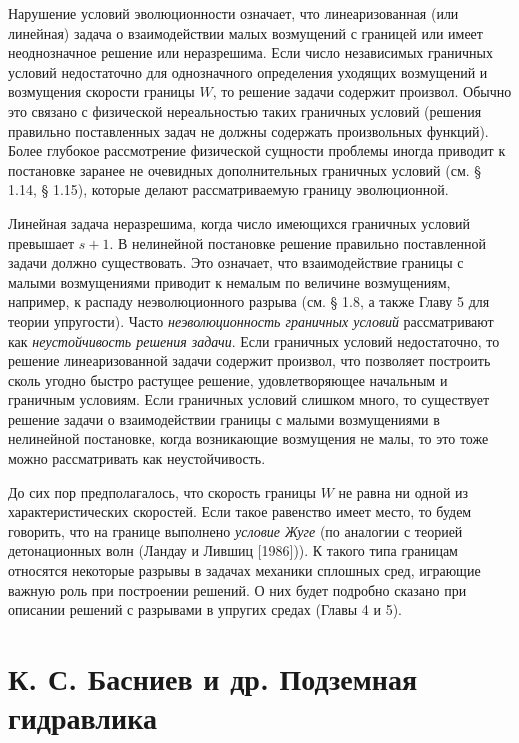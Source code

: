 Нарушение условий эволюционности означает, что линеаризованная (или линейная) задача о взаимодействии малых возмущений с границей или имеет неоднозначное решение или неразрешима. Если число независимых граничных условий недостаточно для однозначного определения уходящих возмущений и возмущения скорости границы $W$, то решение задачи содержит произвол. Обычно это связано с физической нереальностью таких граничных условий (решения правильно поставленных задач не должны содержать произвольных функций). Более глубокое рассмотрение физической сущности проблемы иногда приводит к постановке заранее не очевидных дополнительных граничных условий (см. § 1.14, § 1.15), которые делают рассматриваемую границу эволюционной.

Линейная задача неразрешима, когда число имеющихся граничных условий превышает $s+1$. В нелинейной постановке решение правильно поставленной задачи должно существовать. Это означает, что взаимодействие границы с малыми возмущениями приводит к немалым по величине возмущениям, например, к распаду неэволюционного разрыва (см. § 1.8, а также Главу 5 для теории упругости).
Часто \textit{неэволюционность граничных условий} рассматривают как \textit{неустойчивость решения задачи}. Если граничных условий недостаточно, то решение линеаризованной задачи содержит произвол, что позволяет построить сколь угодно быстро растущее решение, удовлетворяющее начальным и граничным условиям. Если граничных условий слишком много, то существует решение задачи о взаимодействии границы с малыми возмущениями в нелинейной постановке, когда возникающие возмущения не малы, то это тоже можно рассматривать как неустойчивость.

До сих пор предполагалось, что скорость границы $W$ не равна ни одной из характеристических скоростей. Если такое равенство имеет место, то будем говорить, что на границе выполнено \textit{условие Жуге} (по аналогии с теорией детонационных волн (Ландау и Лившиц [1986])). К такого типа границам относятся некоторые разрывы в задачах механики сплошных сред, играющие важную роль при построении решений. О них будет подробно сказано при описании решений с разрывами в упругих средах (Главы 4 и 5).

\section*{К. С. Басниев и др. Подземная гидравлика}
